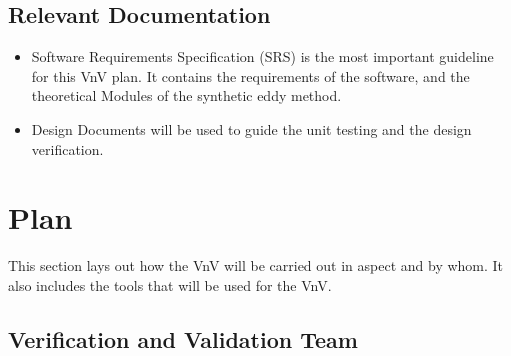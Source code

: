 \documentclass[12pt, titlepage]{article}
\begin{document}


\subsection{Relevant Documentation}

\begin{itemize}
  \item Software Requirements Specification (SRS) \citet{SRS} is the most important guideline for this VnV plan. It contains the requirements of the software, and the theoretical Modules of the synthetic eddy method. 
  \item Design Documents will be used to guide the unit testing and the design verification.
\end{itemize}



\section{Plan}

This section lays out how the VnV will be carried out in aspect and by whom. It also includes the tools that will be used for the VnV.


\subsection{Verification and Validation Team}
\end{document}
